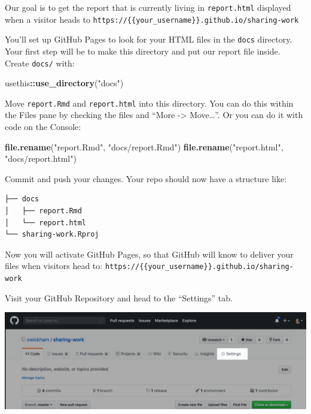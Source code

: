 \documentclass[]{Nemilov}
\newenvironment{Shaded}{\begin{snugshade}}{\end{snugshade}}
\newcommand{\KeywordTok}[1]{\textcolor[rgb]{0.13,0.29,0.53}{\textbf{#1}}}
\newcommand{\NormalTok}[1]{#1}
\newcommand{\OperatorTok}[1]{\textcolor[rgb]{0.81,0.36,0.00}{\textbf{#1}}}
\newcommand{\StringTok}[1]{\textcolor[rgb]{0.31,0.60,0.02}{#1}}
\begin{document}
Our goal is to get the report that is currently living in \texttt{report.html} displayed when a visitor heads to \texttt{https://\{\{your\_username\}\}.github.io/sharing-work}

You'll set up GitHub Pages to look for your HTML files in the \texttt{docs} directory. Your first step will be to make this directory and put our report file inside. Create \texttt{docs/} with:

\begin{Shaded}
\begin{Highlighting}[]
\NormalTok{usethis}\OperatorTok{::}\KeywordTok{use_directory}\NormalTok{(}\StringTok{"docs"}\NormalTok{)}
\end{Highlighting}
\end{Shaded}

Move \texttt{report.Rmd} and \texttt{report.html} into this directory. You can do this within the Files pane by checking the files and ``More -\textgreater{} Move\ldots{}''. Or you can do it with code on the Console:

\begin{Shaded}
\begin{Highlighting}[]
\KeywordTok{file.rename}\NormalTok{(}\StringTok{"report.Rmd"}\NormalTok{, }\StringTok{"docs/report.Rmd"}\NormalTok{)}
\KeywordTok{file.rename}\NormalTok{(}\StringTok{"report.html"}\NormalTok{, }\StringTok{"docs/report.html"}\NormalTok{)}
\end{Highlighting}
\end{Shaded}

Commit and push your changes. Your repo should now have a structure like:

\begin{verbatim}
├── docs
│   ├── report.Rmd
│   └── report.html
└── sharing-work.Rproj
\end{verbatim}

Now you will activate GitHub Pages, so that GitHub will know to deliver your files when visitors head to: \texttt{https://\{\{your\_username\}\}.github.io/sharing-work}

Visit your GitHub Repository and head to the ``Settings'' tab.

\includegraphics{figures/r-publishing/github-settings.png}
\end{document}
